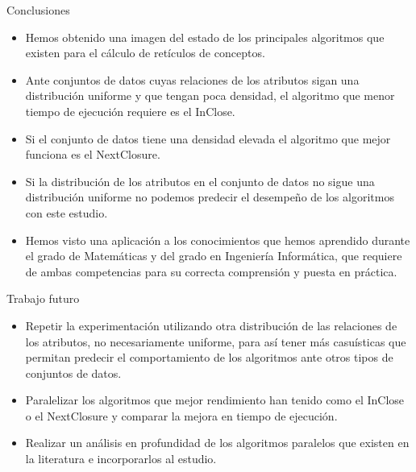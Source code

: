 \documentclass{beamer}
\begin{document}
\begin{frame}{Conclusiones}

    \begin{itemize}
    \justifying
      \item Hemos obtenido una imagen del estado de los principales algoritmos que existen para el cálculo de retículos de conceptos.
      \vspace{2mm}
      \pause
      \item Ante conjuntos de datos cuyas relaciones de los atributos sigan una distribución uniforme y que tengan poca densidad, el algoritmo que menor tiempo de ejecución requiere es el InClose.
      \vspace{2mm}
      \item Si el conjunto de datos tiene una densidad elevada el algoritmo que mejor funciona es el NextClosure.
      \vspace{2mm}
      \item Si la distribución de los atributos en el conjunto de datos no sigue una distribución uniforme no podemos predecir el desempeño de los algoritmos con este estudio.
      \pause
      \vspace{2mm}
      \item Hemos visto una aplicación a los conocimientos que hemos aprendido durante el  grado de Matemáticas y del grado en Ingeniería Informática, que requiere de ambas competencias para su correcta comprensión y puesta en práctica.
    \end{itemize}
\end{frame}


\begin{frame}{Trabajo futuro}

\begin{itemize}
    \justifying
    \item Repetir la experimentación utilizando otra distribución de las relaciones de los atributos, no necesariamente uniforme, para así tener más casuísticas que permitan predecir el comportamiento de los algoritmos ante otros tipos de conjuntos de datos.
    \vspace{4mm}    
    \item Paralelizar los algoritmos que mejor rendimiento han tenido como el InClose o el NextClosure y comparar la mejora en tiempo de ejecución.
    \vspace{4mm}
    \item Realizar un análisis en profundidad de los algoritmos paralelos que existen en la literatura e incorporarlos al estudio.
    
\end{itemize}
\end{frame}
\end{document}
